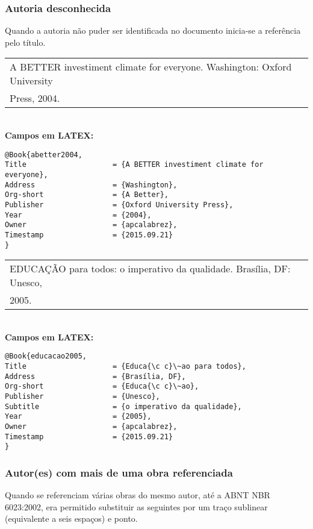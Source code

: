 \subsubsection{Autoria desconhecida} 

Quando a autoria não puder ser identificada no documento inicia-se a refer\^encia pelo título.

\begin{tabular}{|l|c|} \hline
	A BETTER investiment climate for everyone. Washington: Oxford University \\ Press, 2004.\\\hline
\end{tabular}\\

\textbf{Campos em LATEX:}

\begin{verbatim}
@Book{abetter2004,
Title                    = {A BETTER investiment climate for everyone},
Address                  = {Washington},
Org-short                = {A Better},
Publisher                = {Oxford University Press},
Year                     = {2004},
Owner                    = {apcalabrez},
Timestamp                = {2015.09.21}
}
\end{verbatim}

\begin{tabular}{|l|c|} \hline
	EDUCAÇÃO para todos: o imperativo da qualidade. Brasília, DF: Unesco,\\ 2005.\\\hline
\end{tabular}\\

\textbf{Campos em LATEX:}

\begin{verbatim}
@Book{educacao2005,
Title                    = {Educa{\c c}\~ao para todos},
Address                  = {Brasília, DF},
Org-short                = {Educa{\c c}\~ao},
Publisher                = {Unesco},
Subtitle                 = {o imperativo da qualidade},
Year                     = {2005},
Owner                    = {apcalabrez},
Timestamp                = {2015.09.21}
}
\end{verbatim}

\subsubsection{Autor(es) com mais de uma obra referenciada } 

Quando se referenciam v\'arias obras do mesmo autor, at\'e a ABNT NBR 6023:2002, era permitido substituir as seguintes por um traço sublinear (equivalente a seis espaços) e ponto.

